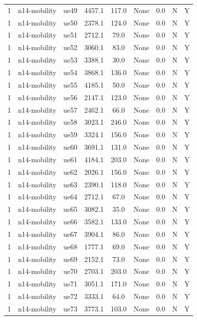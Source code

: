 \begin{table}[ht]
\begin{tabular}{|c|c|c|c|c|c|c|c|c|}
1 & n14-mobility & ue49 & 4457.1 & 117.0 & None & 0.0 & N & Y \\
1 & n14-mobility & ue50 & 2378.1 & 124.0 & None & 0.0 & N & Y \\
1 & n14-mobility & ue51 & 2712.1 & 79.0 & None & 0.0 & N & Y \\
1 & n14-mobility & ue52 & 3060.1 & 83.0 & None & 0.0 & N & Y \\
1 & n14-mobility & ue53 & 3388.1 & 30.0 & None & 0.0 & N & Y \\
1 & n14-mobility & ue54 & 3868.1 & 136.0 & None & 0.0 & N & Y \\
1 & n14-mobility & ue55 & 4185.1 & 50.0 & None & 0.0 & N & Y \\
1 & n14-mobility & ue56 & 2147.1 & 123.0 & None & 0.0 & N & Y \\
1 & n14-mobility & ue57 & 2462.1 & 66.0 & None & 0.0 & N & Y \\
1 & n14-mobility & ue58 & 3023.1 & 246.0 & None & 0.0 & N & Y \\
1 & n14-mobility & ue59 & 3324.1 & 156.0 & None & 0.0 & N & Y \\
1 & n14-mobility & ue60 & 3691.1 & 131.0 & None & 0.0 & N & Y \\
1 & n14-mobility & ue61 & 4184.1 & 203.0 & None & 0.0 & N & Y \\
1 & n14-mobility & ue62 & 2026.1 & 156.0 & None & 0.0 & N & Y \\
1 & n14-mobility & ue63 & 2390.1 & 118.0 & None & 0.0 & N & Y \\
1 & n14-mobility & ue64 & 2712.1 & 67.0 & None & 0.0 & N & Y \\
1 & n14-mobility & ue65 & 3082.1 & 35.0 & None & 0.0 & N & Y \\
1 & n14-mobility & ue66 & 3582.1 & 133.0 & None & 0.0 & N & Y \\
1 & n14-mobility & ue67 & 3904.1 & 86.0 & None & 0.0 & N & Y \\
1 & n14-mobility & ue68 & 1777.1 & 69.0 & None & 0.0 & N & Y \\
1 & n14-mobility & ue69 & 2152.1 & 73.0 & None & 0.0 & N & Y \\
1 & n14-mobility & ue70 & 2703.1 & 203.0 & None & 0.0 & N & Y \\
1 & n14-mobility & ue71 & 3051.1 & 171.0 & None & 0.0 & N & Y \\
1 & n14-mobility & ue72 & 3333.1 & 64.0 & None & 0.0 & N & Y \\
1 & n14-mobility & ue73 & 3773.1 & 103.0 & None & 0.0 & N & Y \\

\end{tabular}
\end{table}
